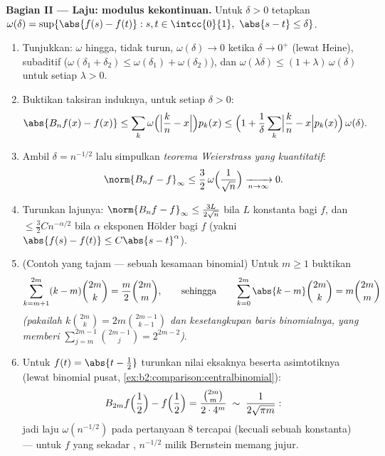 \begin{problem}
\medskip
\noindent\textbf{Bagian II --- Laju: modulus kekontinuan.}
Untuk $\delta > 0$ tetapkan $\omega(\delta) = \sup\{\abs{f(s) - f(t)}
: s, t \in \intcc{0}{1},\ \abs{s - t} \leq \delta\}$.
\begin{enumerate}[resume]
  \item Tunjukkan: $\omega$ hingga, tidak turun,
        $\omega(\delta) \to 0$ ketika $\delta \to 0^+$ (lewat Heine),
        subaditif ($\omega(\delta_1 + \delta_2) \leq
        \omega(\delta_1) + \omega(\delta_2)$), dan
        $\omega(\lambda\delta) \leq (1 +
        \lambda)\,\omega(\delta)$ untuk setiap $\lambda > 0$.
  \item Buktikan taksiran induknya, untuk setiap $\delta > 0$:
        \[
        \abs{B_nf(x) - f(x)}
        \leq \sum_k \omega\Bigl(\Bigl|\frac kn -
        x\Bigr|\Bigr)p_k(x)
        \leq \Bigl(1 + \frac1\delta\sum_k\Bigl|\frac kn -
        x\Bigr|p_k(x)\Bigr)\,\omega(\delta) .
        \]
  \item Ambil $\delta = n^{-1/2}$ lalu simpulkan
        \emph{teorema Weierstrass yang kuantitatif}:
        \[
        \norm{B_nf - f}_\infty \leq
        \frac32\,\omega\Bigl(\frac{1}{\sqrt n}\Bigr)
        \xrightarrow[n\to\infty]{} 0 .
        \]
  \item Turunkan lajunya: $\norm{B_nf - f}_\infty \leq
        \frac{3L}{2\sqrt n}$ bila $L$ konstanta  bagi $f$, dan $\leq
        \frac32 C n^{-\alpha/2}$ bila $\alpha$ eksponen Hölder bagi $f$
        (yakni $\abs{f(s) - f(t)} \leq C\abs{s-t}^\alpha$).
  \item (Contoh yang tajam --- sebuah kesamaan binomial) Untuk $m
        \geq 1$ buktikan
        \[
        \sum_{k=m+1}^{2m} (k - m)\binom{2m}{k}
        = \frac{m}{2}\binom{2m}{m},
        \qquad\text{sehingga}\qquad
        \sum_{k=0}^{2m}\abs{k - m}\binom{2m}{k}
        = m\binom{2m}{m}
        \]
        \emph{(pakailah $k\binom{2m}k = 2m\binom{2m-1}{k-1}$ dan
        kesetangkupan baris binomialnya, yang memberi
        $\sum_{j=m}^{2m-1}\binom{2m-1}{j} = 2^{2m-2}$)}.
  \item Untuk $f(t) = \abs{t - \frac12}$ turunkan nilai eksaknya
        beserta asimtotiknya (lewat binomial pusat,
        \cref{ex:b2:comparison:centralbinomial}):
        \[
        B_{2m}f\Bigl(\frac12\Bigr) - f\Bigl(\frac12\Bigr)
        = \frac{\binom{2m}{m}}{2\cdot4^{m}}
        \;\sim\; \frac{1}{2\sqrt{\pi m}} :
        \]
        jadi laju $\omega(n^{-1/2})$ pada pertanyaan 8 tercapai
        (kecuali sebuah konstanta) --- untuk $f$ yang sekadar ,
        $n^{-1/2}$ milik Bernstein memang jujur.
\end{enumerate}


\end{problem}
